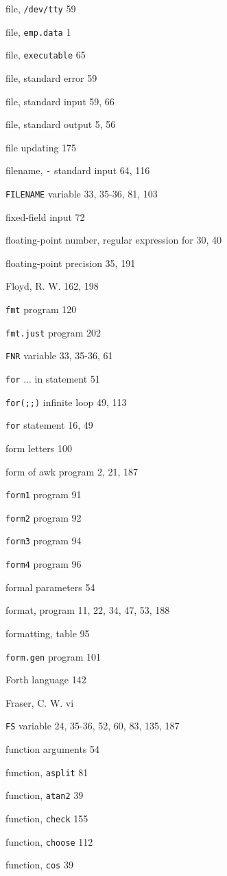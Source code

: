 \begin{multicols}{3}
file, \verb'/dev/tty' 59

file, \verb'emp.data' 1

file, \verb'executable' 65

file, standard error 59

file, standard input 59, 66

file, standard output 5, 56

file updating 175

filename, \verb'-' standard input 64, 116

\verb'FILENAME' variable 33, 35-36, 81, 103

fixed-field input 72

floating-point number, regular expression for 30, 40

floating-point precision 35, 191

Floyd, R. W. 162, 198

\verb'fmt' program 120

\verb'fmt.just' program 202

\verb'FNR' variable 33, 35-36, 61

\verb'for' ... in statement 51

\verb'for(;;)' infinite loop 49, 113

\verb'for' statement 16, 49

form letters 100

form of awk program 2, 21, 187

\verb'form1' program 91

\verb'form2' program 92

\verb'form3' program 94

\verb'form4' program 96

formal parameters 54

format, program 11, 22, 34, 47, 53, 188

formatting, table 95

\verb'form.gen' program 101

Forth language 142

Fraser, C. W. vi

\verb'FS' variable 24, 35-36, 52, 60, 83, 135, 187

function arguments 54

function, \verb'asplit' 81

function, \verb'atan2' 39

function, \verb'check' 155

function, \verb'choose' 112

function, \verb'cos' 39


\end{multicols}
